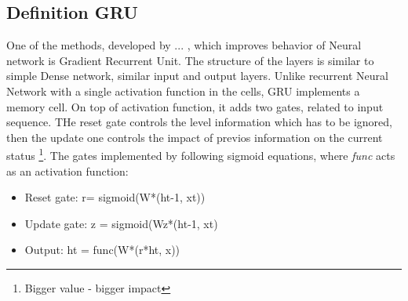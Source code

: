 \subsection{Definition GRU}\label{sec:GRU}
    One of the methods, developed by ... , which improves behavior of Neural network is Gradient Recurrent Unit.
    The structure of the layers is similar to simple Dense network, similar input and output layers.
    Unlike recurrent Neural Network with a single activation function in the cells, GRU implements a memory cell.
    On top of activation function, it adds two gates, related to input sequence.
    THe reset gate controls the level information which has to be ignored, then the update one controls the impact of previos information on the current status \footnote{Bigger value - bigger impact}.
    The gates implemented by following sigmoid equations, where \textit{func} acts as an activation function:
    \begin{itemize}
        \item Reset gate: r= sigmoid(W*(ht-1, xt))
        \item Update gate: z = sigmoid(Wz*(ht-1, xt)
        \item Output: ht = func(W*(r*ht, x))
    \end{itemize}
    
    